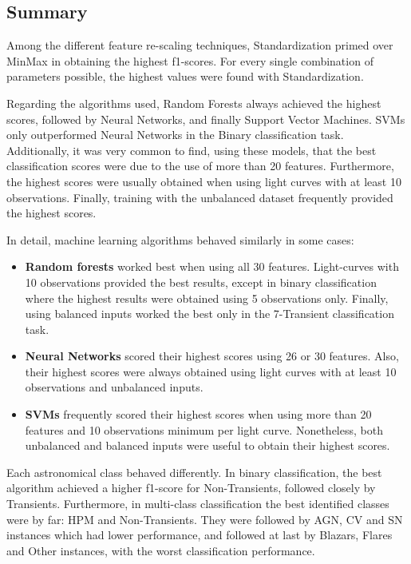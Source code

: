 \subsection{Summary}

Among the different feature re-scaling techniques, Standardization primed over MinMax in obtaining the highest f1-scores. For every single combination of parameters possible, the highest values were found with Standardization.

Regarding the algorithms used, Random Forests always achieved the highest scores, followed by Neural Networks, and finally Support Vector Machines. SVMs only outperformed Neural Networks in the Binary classification task. Additionally, it was very common to find, using these models, that the best classification scores were due to the use of more than 20 features. Furthermore, the highest scores were usually obtained when using light curves with at least 10 observations. Finally, training with the unbalanced dataset frequently provided the highest scores.

In detail, machine learning algorithms behaved similarly in some cases:

\begin{itemize}
    \item \textbf{Random forests} worked best when using all 30 features. Light-curves with 10 observations provided the best results, except in binary classification where the highest results were obtained using 5 observations only. Finally, using balanced inputs worked the best only in the 7-Transient classification task. 
    \item \textbf{Neural Networks} scored their highest scores using 26 or 30 features. Also, their highest scores were always obtained using light curves with at least 10 observations and unbalanced inputs.
    \item \textbf{SVMs} frequently scored their highest scores when using more than 20 features and 10 observations minimum per light curve. Nonetheless, both unbalanced and balanced inputs were useful to obtain their highest scores.
\end{itemize}

Each astronomical class behaved differently. In binary classification, the best algorithm achieved a higher f1-score for Non-Transients, followed closely by Transients. Furthermore, in multi-class classification the best identified classes were by far: HPM and Non-Transients. They were followed by AGN, CV and SN instances which had lower performance, and followed at last by Blazars, Flares and Other instances, with the worst classification performance. 

